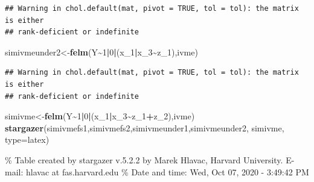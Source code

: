 \documentclass[
]{article}
\newenvironment{Shaded}{\begin{snugshade}}{\end{snugshade}}
\newcommand{\DataTypeTok}[1]{\textcolor[rgb]{0.13,0.29,0.53}{#1}}
\newcommand{\DecValTok}[1]{\textcolor[rgb]{0.00,0.00,0.81}{#1}}
\newcommand{\KeywordTok}[1]{\textcolor[rgb]{0.13,0.29,0.53}{\textbf{#1}}}
\newcommand{\NormalTok}[1]{#1}
\newcommand{\OperatorTok}[1]{\textcolor[rgb]{0.81,0.36,0.00}{\textbf{#1}}}
\newcommand{\StringTok}[1]{\textcolor[rgb]{0.31,0.60,0.02}{#1}}
\begin{document}
\begin{verbatim}
## Warning in chol.default(mat, pivot = TRUE, tol = tol): the matrix is either
## rank-deficient or indefinite
\end{verbatim}

\begin{Shaded}
\begin{Highlighting}[]
\NormalTok{simivmeunder2\textless{}{-}}\KeywordTok{felm}\NormalTok{(Y}\OperatorTok{\textasciitilde{}}\DecValTok{1}\OperatorTok{|}\DecValTok{0}\OperatorTok{|}\NormalTok{(x\_}\DecValTok{1}\OperatorTok{|}\NormalTok{x\_}\DecValTok{3}\OperatorTok{\textasciitilde{}}\NormalTok{z\_}\DecValTok{1}\NormalTok{),ivme)}
\end{Highlighting}
\end{Shaded}

\begin{verbatim}
## Warning in chol.default(mat, pivot = TRUE, tol = tol): the matrix is either
## rank-deficient or indefinite
\end{verbatim}

\begin{Shaded}
\begin{Highlighting}[]
\NormalTok{simivme\textless{}{-}}\KeywordTok{felm}\NormalTok{(Y}\OperatorTok{\textasciitilde{}}\DecValTok{1}\OperatorTok{|}\DecValTok{0}\OperatorTok{|}\NormalTok{(x\_}\DecValTok{1}\OperatorTok{|}\NormalTok{x\_}\DecValTok{3}\OperatorTok{\textasciitilde{}}\NormalTok{z\_}\DecValTok{1}\OperatorTok{+}\NormalTok{z\_}\DecValTok{2}\NormalTok{),ivme)}
\KeywordTok{stargazer}\NormalTok{(simivmefs1,simivmefs2,simivmeunder1,simivmeunder2, simivme,  }\DataTypeTok{type=}\StringTok{\textquotesingle{}latex\textquotesingle{}}\NormalTok{)}
\end{Highlighting}
\end{Shaded}

\% Table created by stargazer v.5.2.2 by Marek Hlavac, Harvard
University. E-mail: hlavac at fas.harvard.edu \% Date and time: Wed, Oct
07, 2020 - 3:49:42 PM
\end{document}
